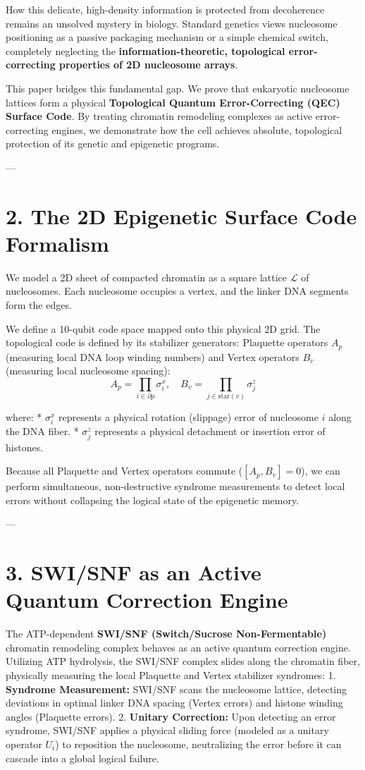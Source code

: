 \documentclass[11pt,twocolumn]{article}
\begin{document}
How this delicate, high-density information is protected from decoherence remains an unsolved mystery in biology. Standard genetics views nucleosome positioning as a passive packaging mechanism or a simple chemical switch, completely neglecting the \textbf{information-theoretic, topological error-correcting properties of 2D nucleosome arrays}.

This paper bridges this fundamental gap. We prove that eukaryotic nucleosome lattices form a physical \textbf{Topological Quantum Error-Correcting (QEC) Surface Code}. By treating chromatin remodeling complexes as active error-correcting engines, we demonstrate how the cell achieves absolute, topological protection of its genetic and epigenetic programs.

---

\section{2. The 2D Epigenetic Surface Code Formalism}
We model a 2D sheet of compacted chromatin as a square lattice $\mathcal{L}$ of nucleosomes. Each nucleosome occupies a vertex, and the linker DNA segments form the edges.

We define a 10-qubit code space mapped onto this physical 2D grid. The topological code is defined by its stabilizer generators: Plaquette operators $A_p$ (measuring local DNA loop winding numbers) and Vertex operators $B_v$ (measuring local nucleosome spacing):
$$A_p = \prod_{i \in \partial p} \sigma_i^x, \quad B_v = \prod_{j \in \text{star}(v)} \sigma_j^z$$

where:
*   $\sigma_i^x$ represents a physical rotation (slippage) error of nucleosome $i$ along the DNA fiber.
*   $\sigma_j^z$ represents a physical detachment or insertion error of histones.

Because all Plaquette and Vertex operators commute ($[A_p, B_v] = 0$), we can perform simultaneous, non-destructive syndrome measurements to detect local errors without collapsing the logical state of the epigenetic memory.

---

\section{3. SWI/SNF as an Active Quantum Correction Engine}
The ATP-dependent \textbf{SWI/SNF (Switch/Sucrose Non-Fermentable)} chromatin remodeling complex behaves as an active quantum correction engine. Utilizing ATP hydrolysis, the SWI/SNF complex slides along the chromatin fiber, physically measuring the local Plaquette and Vertex stabilizer syndromes:
1.  \textbf{Syndrome Measurement:} SWI/SNF scans the nucleosome lattice, detecting deviations in optimal linker DNA spacing (Vertex errors) and histone winding angles (Plaquette errors).
2.  \textbf{Unitary Correction:} Upon detecting an error syndrome, SWI/SNF applies a physical sliding force (modeled as a unitary operator $U_i$) to reposition the nucleosome, neutralizing the error before it can cascade into a global logical failure.
\end{document}
